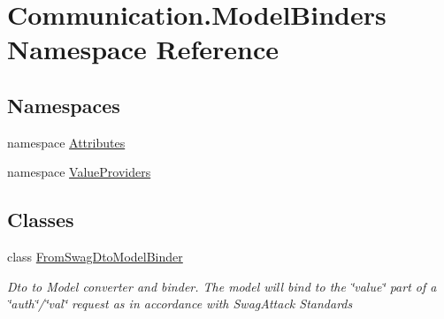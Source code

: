 \hypertarget{namespace_communication_1_1_model_binders}{}\section{Communication.\+Model\+Binders Namespace Reference}
\label{namespace_communication_1_1_model_binders}
\subsection*{Namespaces}
\begin{DoxyCompactItemize}
\item 
namespace \mbox{\hyperlink{namespace_communication_1_1_model_binders_1_1_attributes}{Attributes}}
\item 
namespace \mbox{\hyperlink{namespace_communication_1_1_model_binders_1_1_value_providers}{Value\+Providers}}
\end{DoxyCompactItemize}
\subsection*{Classes}
\begin{DoxyCompactItemize}
\item 
class \mbox{\hyperlink{class_communication_1_1_model_binders_1_1_from_swag_dto_model_binder}{From\+Swag\+Dto\+Model\+Binder}}
\begin{DoxyCompactList}\small\item\em Dto to Model converter and binder. The model will bind to the \char`\"{}value\char`\"{} part of a \char`\"{}auth\char`\"{}/\char`\"{}val\char`\"{} request as in accordance with Swag\+Attack Standards \end{DoxyCompactList}\end{DoxyCompactItemize}
